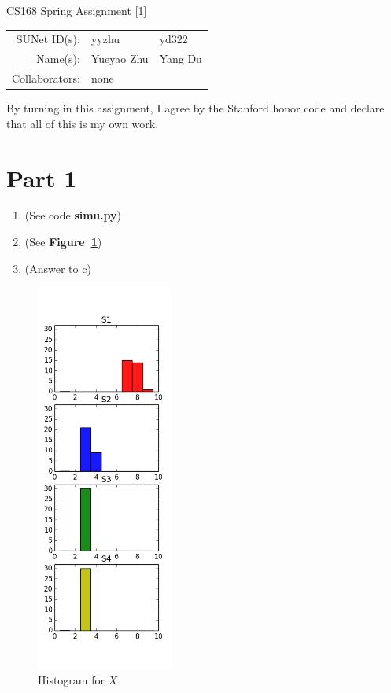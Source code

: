 \documentclass[12pt]{article}
\begin{document}
\begin{center}
{\Large CS168 Spring Assignment [1]}
\newline

\begin{tabular}{rll}
SUNet ID(s): & yyzhu & yd322 \\
Name(s): & Yueyao Zhu & Yang Du \\
Collaborators: & none
\end{tabular}
\end{center}

By turning in this assignment, I agree by the Stanford honor code and declare
that all of this is my own work.

\section*{Part 1}

\begin{enumerate}[label=(\alph*)]
  \item (See code \textbf{simu.py})
  \item (See \textbf{Figure~\ref{fig:plot}})
	\item (Answer to c)
\end{enumerate}

\begin{figure}[h]
	\centering
	\includegraphics[width=0.4\textwidth]{figure_1.png}
	\caption{Histogram for $X$}
	\label{fig:plot}
\end{figure}
\end{document}
